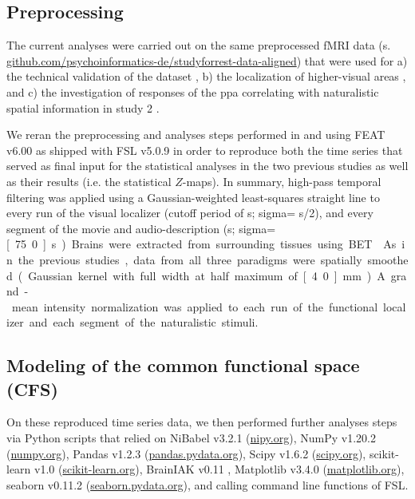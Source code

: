 \subsection{Preprocessing}

The current analyses were carried out on the same preprocessed fMRI data (s.
\href{https://github.com/psychoinformatics-de/studyforrest-data-aligned
}{\url{github.com/psychoinformatics-de/studyforrest-data-aligned}}) that were
used for
%
a) the technical validation of the dataset \citep{hanke2016simultaneous},
%
b) the localization of higher-visual areas \citep{sengupta2016extension}, and
%
c) the investigation of responses of the \ac{ppa} correlating with naturalistic
spatial information in study 2 \citep{haeusler2022processing}.

%
We reran the preprocessing and analyses steps performed in
\citet{sengupta2016extension} and \citet{haeusler2022processing} using FEAT
v6.00 \citep[FMRI Expert Analysis Tool;][]{woolrich2001autocorr} as shipped with
FSL v5.0.9 \citep[\href{https://www.fmrib.ox.ac.uk/fsl}{FMRIB's Software
Library;}][]{smith2004fsl} in order to reproduce both the time series that
served as final input for the statistical analyses in the two previous studies
as well as their results (i.e. the statistical $Z$-maps).
In summary, high-pass temporal filtering was applied using a Gaussian-weighted
least-squares straight line to every run of the visual localizer (cutoff period
of \unit[100]{s}; sigma= \unit[100]{s}/2), and every segment of the
movie and audio-description (\unit[150]{s}; sigma=\unit[75.0]{s}).
Brains were extracted from surrounding tissues using BET \citep{smith2002bet}.
As in the previous studies, data from all three paradigms were spatially
smoothed (Gaussian kernel with full width at half maximum of \unit[4.0]{mm}).
A grand-mean intensity normalization was applied to each run of the functional
localizer and each segment of the naturalistic stimuli.


\subsection{Modeling of the common functional space (CFS)}

On these reproduced time series data, we then performed further analyses steps
via Python scripts that relied on
%
NiBabel v3.2.1 (\href{https://nipy.org}{\url{nipy.org}}),
%
NumPy v1.20.2 (\href{https://numpy.org}{\url{numpy.org}}),
%
Pandas v1.2.3 (\href{https://pandas.pydata.org}{\url{pandas.pydata.org}}),
%
Scipy v1.6.2 (\href{https://scipy.org}{\url{scipy.org}}),
%
scikit-learn v1.0 (\href{https://scikit-learn.org}{\url{scikit-learn.org}}),
%
BrainIAK v0.11
\citep[\href{https://brainiak.org}{\url{brainiak.org}}][]{kumar2020brainiak,
kumar2020brainiaktutorial},
%
Matplotlib v3.4.0 (\href{https://matplotlib.org}{\url{matplotlib.org}}),
%
seaborn v0.11.2 (\href{https://seaborn.pydata.org}{\url{seaborn.pydata.org}}),
%
and calling command line functions of FSL.

